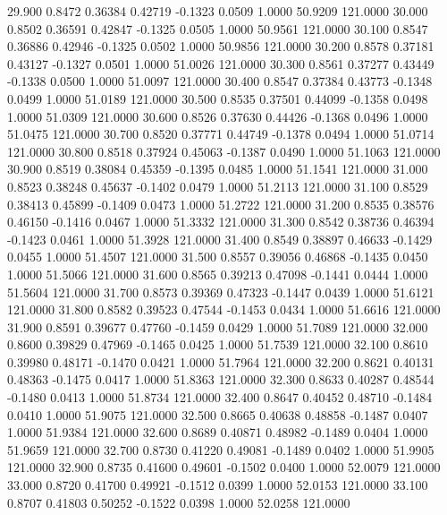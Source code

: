   29.900   0.8472   0.36384   0.42719  -0.1323   0.0509   1.0000  50.9209 121.0000
  30.000   0.8502   0.36591   0.42847  -0.1325   0.0505   1.0000  50.9561 121.0000
  30.100   0.8547   0.36886   0.42946  -0.1325   0.0502   1.0000  50.9856 121.0000
  30.200   0.8578   0.37181   0.43127  -0.1327   0.0501   1.0000  51.0026 121.0000
  30.300   0.8561   0.37277   0.43449  -0.1338   0.0500   1.0000  51.0097 121.0000
  30.400   0.8547   0.37384   0.43773  -0.1348   0.0499   1.0000  51.0189 121.0000
  30.500   0.8535   0.37501   0.44099  -0.1358   0.0498   1.0000  51.0309 121.0000
  30.600   0.8526   0.37630   0.44426  -0.1368   0.0496   1.0000  51.0475 121.0000
  30.700   0.8520   0.37771   0.44749  -0.1378   0.0494   1.0000  51.0714 121.0000
  30.800   0.8518   0.37924   0.45063  -0.1387   0.0490   1.0000  51.1063 121.0000
  30.900   0.8519   0.38084   0.45359  -0.1395   0.0485   1.0000  51.1541 121.0000
  31.000   0.8523   0.38248   0.45637  -0.1402   0.0479   1.0000  51.2113 121.0000
  31.100   0.8529   0.38413   0.45899  -0.1409   0.0473   1.0000  51.2722 121.0000
  31.200   0.8535   0.38576   0.46150  -0.1416   0.0467   1.0000  51.3332 121.0000
  31.300   0.8542   0.38736   0.46394  -0.1423   0.0461   1.0000  51.3928 121.0000
  31.400   0.8549   0.38897   0.46633  -0.1429   0.0455   1.0000  51.4507 121.0000
  31.500   0.8557   0.39056   0.46868  -0.1435   0.0450   1.0000  51.5066 121.0000
  31.600   0.8565   0.39213   0.47098  -0.1441   0.0444   1.0000  51.5604 121.0000
  31.700   0.8573   0.39369   0.47323  -0.1447   0.0439   1.0000  51.6121 121.0000
  31.800   0.8582   0.39523   0.47544  -0.1453   0.0434   1.0000  51.6616 121.0000
  31.900   0.8591   0.39677   0.47760  -0.1459   0.0429   1.0000  51.7089 121.0000
  32.000   0.8600   0.39829   0.47969  -0.1465   0.0425   1.0000  51.7539 121.0000
  32.100   0.8610   0.39980   0.48171  -0.1470   0.0421   1.0000  51.7964 121.0000
  32.200   0.8621   0.40131   0.48363  -0.1475   0.0417   1.0000  51.8363 121.0000
  32.300   0.8633   0.40287   0.48544  -0.1480   0.0413   1.0000  51.8734 121.0000
  32.400   0.8647   0.40452   0.48710  -0.1484   0.0410   1.0000  51.9075 121.0000
  32.500   0.8665   0.40638   0.48858  -0.1487   0.0407   1.0000  51.9384 121.0000
  32.600   0.8689   0.40871   0.48982  -0.1489   0.0404   1.0000  51.9659 121.0000
  32.700   0.8730   0.41220   0.49081  -0.1489   0.0402   1.0000  51.9905 121.0000
  32.900   0.8735   0.41600   0.49601  -0.1502   0.0400   1.0000  52.0079 121.0000
  33.000   0.8720   0.41700   0.49921  -0.1512   0.0399   1.0000  52.0153 121.0000
  33.100   0.8707   0.41803   0.50252  -0.1522   0.0398   1.0000  52.0258 121.0000
